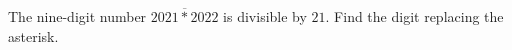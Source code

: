 The nine-digit number $\overline{2021*2022}$ is divisible by $21$. Find the digit replacing the asterisk.
